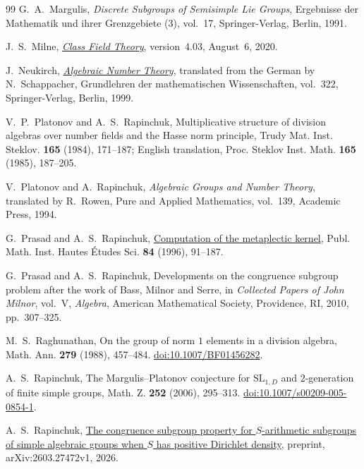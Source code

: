 \begin{thebibliography}{99}
G.~A.~Margulis,
\emph{Discrete Subgroups of Semisimple Lie Groups},
Ergebnisse der Mathematik und ihrer Grenzgebiete (3), vol.~17,
Springer-Verlag, Berlin, 1991.

J.~S.~Milne,
\emph{\href{https://www.jmilne.org/math/CourseNotes/CFT.pdf}{Class Field
Theory}}, version~4.03, August~6, 2020.

J.~Neukirch,
\emph{\href{https://doi.org/10.1007/978-3-662-03983-0}{Algebraic
Number Theory}},
translated from the German by N.~Schappacher,
Grundlehren der mathematischen Wissenschaften, vol.~322,
Springer-Verlag, Berlin, 1999.

V.~P.~Platonov and A.~S.~Rapinchuk,
Multiplicative structure of division algebras over number fields
and the Hasse norm principle,
Trudy Mat. Inst. Steklov. \textbf{165} (1984), 171--187;
English translation, Proc. Steklov Inst. Math. \textbf{165} (1985), 187--205.

V.~Platonov and A.~Rapinchuk,
\emph{Algebraic Groups and Number Theory},
translated by R.~Rowen,
Pure and Applied Mathematics, vol.~139,
Academic Press, 1994.

G.~Prasad and A.~S.~Rapinchuk,
\href{https://doi.org/10.1007/BF02698836}{Computation of the
metaplectic kernel},
Publ. Math. Inst. Hautes \'Etudes Sci. \textbf{84} (1996), 91--187.

G.~Prasad and A.~S.~Rapinchuk,
Developments on the congruence subgroup problem after the work of
Bass, Milnor and Serre,
in \emph{Collected Papers of John Milnor}, vol.~V, \emph{Algebra},
American Mathematical Society, Providence, RI, 2010, pp.~307--325.

M.~S.~Raghunathan,
On the group of norm $1$ elements in a division algebra,
Math. Ann. \textbf{279} (1988), 457--484.
\href{https://doi.org/10.1007/BF01456282}{doi:10.1007/BF01456282}.

A.~S.~Rapinchuk,
The Margulis--Platonov conjecture for $\mathrm{SL}_{1,D}$
and $2$-generation of finite simple groups,
Math. Z. \textbf{252} (2006), 295--313.
\href{https://doi.org/10.1007/s00209-005-0854-1}{doi:10.1007/s00209-005-0854-1}.

A.~S.~Rapinchuk,
\href{https://arxiv.org/abs/2603.27472v1}{The congruence subgroup
property for $S$-arithmetic subgroups of simple algebraic groups when
$S$ has positive Dirichlet density},
preprint, arXiv:2603.27472v1, 2026.


\end{thebibliography}
